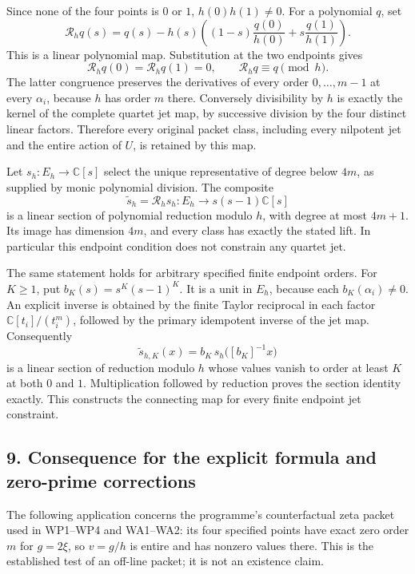 \documentclass[
  10pt,
  a4paper,
]{article}
\begin{document}
Since none of the four points is \(0\) or \(1\), \(h(0)h(1)\ne0\). For a
polynomial \(q\), set \[
\boxed{\mathcal R_hq(s)=q(s)-h(s)
\left((1-s)\frac{q(0)}{h(0)}+s\frac{q(1)}{h(1)}\right).}
\tag{ISP34}
\] This is a linear polynomial map. Substitution at the two endpoints
gives \[
\mathcal R_hq(0)=\mathcal R_hq(1)=0,
\qquad\mathcal R_hq\equiv q\pmod h.
\tag{ISP35}
\] The latter congruence preserves the derivatives of every order
\(0,\ldots,m-1\) at every \(\alpha_i\), because \(h\) has order \(m\)
there. Conversely divisibility by \(h\) is exactly the kernel of the
complete quartet jet map, by successive division by the four distinct
linear factors. Therefore every original packet class, including every
nilpotent jet and the entire action of \(U\), is retained by this map.

Let \(s_h:E_h\to\mathbb C[s]\) select the unique representative of
degree below \(4m\), as supplied by monic polynomial division. The
composite \[
\widetilde s_h=\mathcal R_hs_h:
E_h\longrightarrow s(s-1)\mathbb C[s]
\tag{ISP36}
\] is a linear section of polynomial reduction modulo \(h\), with degree
at most \(4m+1\). Its image has dimension \(4m\), and every class has
exactly the stated lift. In particular this endpoint condition does not
constrain any quartet jet.

The same statement holds for arbitrary specified finite endpoint orders.
For \(K\ge1\), put \(b_K(s)=s^K(s-1)^K\). It is a unit in \(E_h\),
because each \(b_K(\alpha_i)\ne0\). An explicit inverse is obtained by
the finite Taylor reciprocal in each factor \(\mathbb C[t_i]/(t_i^m)\),
followed by the primary idempotent inverse of the jet map. Consequently
\[
\widetilde s_{h,K}(x)=b_K\,s_h\bigl([b_K]^{-1}x\bigr)
\tag{ISP37}
\] is a linear section of reduction modulo \(h\) whose values vanish to
order at least \(K\) at both \(0\) and \(1\). Multiplication followed by
reduction proves the section identity exactly. This constructs the
connecting map for every finite endpoint jet constraint.

\subsection{9. Consequence for the explicit formula and zero-prime
corrections}\label{consequence-for-the-explicit-formula-and-zero-prime-corrections}

The following application concerns the programme's counterfactual zeta
packet used in WP1--WP4 and WA1--WA2: its four specified points have
exact zero order \(m\) for \(g=2\xi\), so \(v=g/h\) is entire and has
nonzero values there. This is the established test of an off-line
packet; it is not an existence claim.
\end{document}
